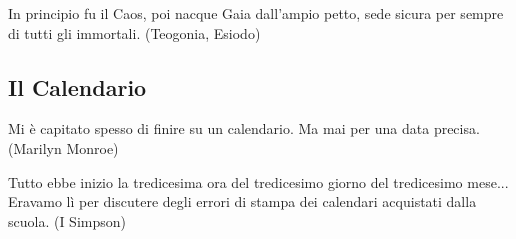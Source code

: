 \vfill

\begin{enfasi}
In principio fu il Caos, poi nacque Gaia dall'ampio petto, sede sicura per sempre di tutti gli immortali. (Teogonia, Esiodo)
\end{enfasi}




\pagebreak

\subsection{Il Calendario}

\begin{enfasi}{
Mi è capitato spesso di finire su un calendario. Ma mai per una data precisa. (Marilyn Monroe)

\medskip

Tutto ebbe inizio la tredicesima ora del tredicesimo giorno del tredicesimo mese... Eravamo lì per discutere degli errori di stampa dei calendari acquistati dalla scuola. (I Simpson)} \end{enfasi}

\medskip

